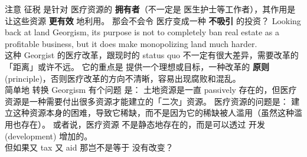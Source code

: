 \begin{preview}
\begin{minipage}{\textwidth}
注意 征税 是针对 医疗资源的 \textbf{拥有者}（不一定是 医生护士等工作者），其作用是 让这些资源 \textbf{更有效} 地利用。 那会不会令 医疗变成一种 \textbf{不吸引} 的投资？ Looking back at land Georgism, its purpose is not to completely ban real estate as a profitable business, but it does make monopolizing land much harder.\\

这种 Georgist 的医疗改革，跟现时的 status quo 不一定有很大差异，需要改革的「距离」或许不远。 它的重点是 提供一个理想或目标，一种改革的 \textbf{原则} (principle)，否则医疗改革的方向不清晰，容易出现腐败和混乱。  \\

简单地 转换 Georgism 有个问题 是： 土地资源是一直 passively 存在的，但医疗资源是一种需要付出很多资源才能建立的「二次」资源。 医疗资源的问题是： 建立这种资源本身的困难，导致它稀缺，而不是因为它的稀缺被人滥用（虽然这种滥用也存在）。 或者说，医疗资源 不是静态地存在的，而是可以透过 开发 (development) 增加的。 \\

但如果又 tax 又 aid 那岂不是等于 没有改变？

\end{minipage}
\end{preview}

